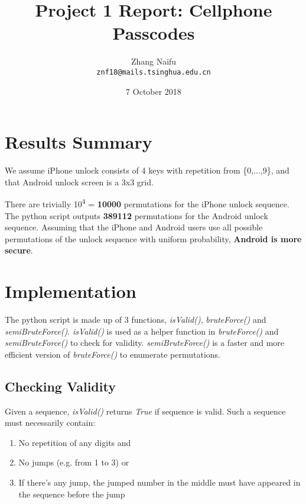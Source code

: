 \documentclass{article}
\title{Project 1 Report: Cellphone Passcodes} %
\author{Zhang Naifu\\ \texttt{znf18@mails.tsinghua.edu.cn}} %
\date{7 October 2018} %
\begin{document}
\maketitle %


\section{Results Summary} %

We assume iPhone unlock consists of 4 keys with repetition from \{0,...,9\}, and that Android unlock screen is a 3x3 grid.

There are trivially 10\textsuperscript{4} = \textbf{10000} permutations for the iPhone unlock sequence.
The python script outputs \textbf{389112} permutations for the Android unlock sequence.
Assuming that the iPhone and Android users use all possible permutations of the unlock sequence with uniform probability, \textbf{Android is more secure}.



\section{Implementation} %

The python script is made up of 3 functions, \textit{isValid()}, \textit{bruteForce()} and \textit{semiBruteForce()}. 
\textit{isValid()} is used as a helper function in \textit{bruteForce()} and \textit{semiBruteForce()} to check for validity. \textit{semiBruteForce()} is a faster and more efficient version of \textit{bruteForce()} to enumerate permutations.

\subsection{Checking Validity} %

Given a sequence, \textit{isValid()} returns \textit{True} if sequence is valid. Such a sequence must necessarily contain:
	\begin{enumerate} 
		\itemsep-0.3em 
		\item No repetition of any digits and
		\item No jumps (e.g. from 1 to 3) or 
		\item If there’s any jump, the jumped number in the middle must have appeared in the sequence before the jump
	\end{enumerate}
    
\end{document}
